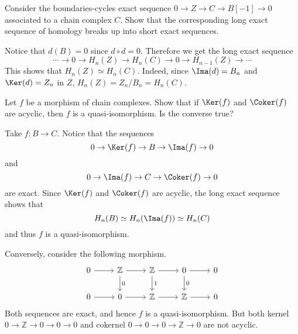 \begin{exer} Consider the boundaries-cycles exact sequence $0\rightarrow Z\rightarrow C\rightarrow B[-1]\rightarrow 0$ associated to a chain complex $C$. Show that the corresponding long exact sequence of homology breaks up into short exact sequences.
\end{exer}
\begin{solution} Notice that $d(B)=0$ since $d\circ d=0$. Therefore we get the long exact sequence
\begin{equation}
\cdots\rightarrow 0\rightarrow H_n(Z)\rightarrow H_n(C)\rightarrow 0\rightarrow H_{n-1}(Z)\rightarrow\cdots
\end{equation}
This shows that $H_n(Z)\simeq H_n(C)$. Indeed, since $\Ima(d)=B_n$ and $\Ker(d)=Z_n$ in $Z$, $H_n(Z)=Z_n/B_n=H_n(C)$.
\end{solution}

\begin{exer} Let $f$ be a morphism of chain complexes. Show that if $\Ker(f)$ and $\Coker(f)$ are acyclic, then $f$ is a quasi-isomorphism. Is the converse true?
\end{exer}
\begin{solution} Take $f:B\rightarrow C$. Notice that the sequences
\begin{equation}
0\rightarrow \Ker(f)\rightarrow B\rightarrow \Ima(f)\rightarrow 0
\end{equation}
and
\begin{equation}
0\rightarrow \Ima(f)\rightarrow C\rightarrow \Coker(f)\rightarrow 0
\end{equation}
are exact. Since $\Ker(f)$ and $\Coker(f)$ are acyclic, the long exact sequence shows that
\begin{equation}
H_n(B)\simeq H_n(\Ima(f))\simeq H_n(C)
\end{equation}
and thus $f$ is a quasi-isomorphism.

Conversely, consider the following morphism.
\begin{equation}
\begin{tikzcd}
0\arrow{r} & \mathbb{Z}\arrow{r} \arrow{d}{0} & \mathbb{Z}\arrow{r} \arrow{d}{1}& 0\arrow{r} \arrow{d}{0}& 0\\
0\arrow{r} &0\arrow{r} & \mathbb{Z}\arrow{r}& \mathbb{Z}\arrow{r} & 0
\end{tikzcd}
\end{equation}
Both sequences are exact, and hence $f$ is a quasi-isomorphism. But both kernel $0\rightarrow \mathbb{Z}\rightarrow 0\rightarrow 0\rightarrow 0$ and cokernel $0\rightarrow 0\rightarrow 0\rightarrow \mathbb{Z}\rightarrow 0$ are not acyclic.
\end{solution}

